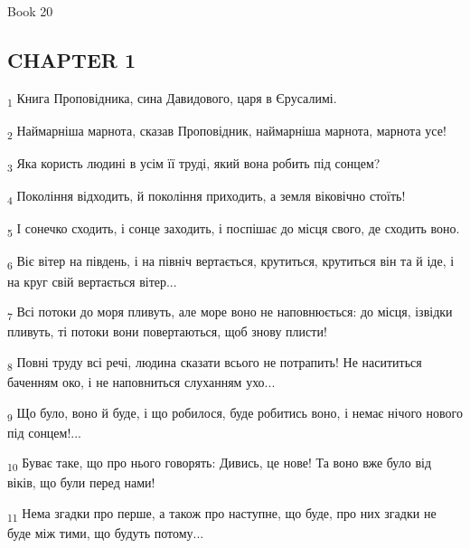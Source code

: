 Book 20
\subsection{CHAPTER 1}
\begin{tcolorbox}
\textsubscript{1} Книга Проповідника, сина Давидового, царя в Єрусалимі.
\end{tcolorbox}
\begin{tcolorbox}
\textsubscript{2} Наймарніша марнота, сказав Проповідник, наймарніша марнота, марнота усе!
\end{tcolorbox}
\begin{tcolorbox}
\textsubscript{3} Яка користь людині в усім її труді, який вона робить під сонцем?
\end{tcolorbox}
\begin{tcolorbox}
\textsubscript{4} Покоління відходить, й покоління приходить, а земля віковічно стоїть!
\end{tcolorbox}
\begin{tcolorbox}
\textsubscript{5} І сонечко сходить, і сонце заходить, і поспішає до місця свого, де сходить воно.
\end{tcolorbox}
\begin{tcolorbox}
\textsubscript{6} Віє вітер на південь, і на північ вертається, крутиться, крутиться він та й іде, і на круг свій вертається вітер...
\end{tcolorbox}
\begin{tcolorbox}
\textsubscript{7} Всі потоки до моря пливуть, але море воно не наповнюється: до місця, ізвідки пливуть, ті потоки вони повертаються, щоб знову плисти!
\end{tcolorbox}
\begin{tcolorbox}
\textsubscript{8} Повні труду всі речі, людина сказати всього не потрапить! Не насититься баченням око, і не наповниться слуханням ухо...
\end{tcolorbox}
\begin{tcolorbox}
\textsubscript{9} Що було, воно й буде, і що робилося, буде робитись воно, і немає нічого нового під сонцем!...
\end{tcolorbox}
\begin{tcolorbox}
\textsubscript{10} Буває таке, що про нього говорять: Дивись, це нове! Та воно вже було від віків, що були перед нами!
\end{tcolorbox}
\begin{tcolorbox}
\textsubscript{11} Нема згадки про перше, а також про наступне, що буде, про них згадки не буде між тими, що будуть потому...
\end{tcolorbox}

